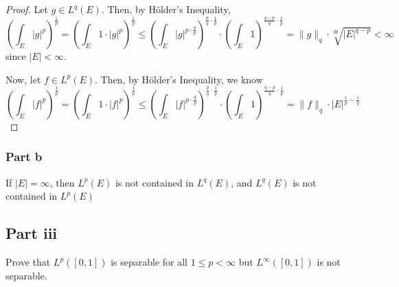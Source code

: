 \begin{answer}
    \begin{proof}
        Let $g \in L^q(E)$. Then, by Hölder's Inequality,
        \begin{equation}
            \left(\int_E \lvert g \rvert^p\right)^{\frac{1}{p}} = \left(\int_E 1 \cdot \lvert g \rvert^p\right)^{\frac{1}{p}} \leq \left(\int_E \lvert g \rvert^{p\cdot\frac{q}{p}}\right)^{\frac{p}{q}\cdot\frac{1}{p}} \cdot \left(\int_E 1\right)^{\frac{q-p}{q}\cdot\frac{1}{p}} = \lVert g \rVert_q \cdot \sqrt[qp]{\lvert E \rvert^{q-p}} < \infty
        \end{equation}
        since $\lvert E \rvert < \infty$.
        
        Now, let $f \in L^p(E)$. Then, by Hölder's Inequality, we know
        \begin{equation}
            \left(\int_E \lvert f \rvert^p\right)^{\frac{1}{p}} = \left(\int_E 1 \cdot \lvert f \rvert^p\right)^{\frac{1}{p}} \leq \left(\int_E \lvert f \rvert^{p\cdot\frac{q}{p}}\right)^{\frac{p}{q}\cdot\frac{1}{p}} \cdot \left(\int_E 1\right)^{\frac{q-p}{q}\cdot\frac{1}{p}} = \lVert f \rVert_q \cdot \lvert E \rvert^{\frac{1}{p} - \frac{1}{q}}
        \end{equation}
    \end{proof}
\end{answer}

\subsubsection{Part b}

\begin{question}
    If $|E|=\infty$, then $L^p(E)$ is not contained in $L^q(E)$, and $L^q(E)$ is not contained in $L^p(E)$
\end{question}

\begin{answer}
    
\end{answer}

\subsection{Part iii}

\begin{question}
    Prove that $L^p([0,1])$ is separable for all $1 \leq p<\infty$ but $L^{\infty}([0,1])$ is not separable.
\end{question}

